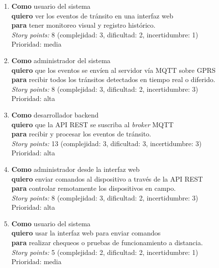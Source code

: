 \documentclass[
11pt, %
]{charter}
\begin{document}
\begin{enumerate}

\item
\textbf{Como} usuario del sistema\\
\textbf{quiero} ver los eventos de tránsito en una interfaz web\\
\textbf{para} tener monitoreo visual y registro histórico.\\
\textit{Story points:} 8 (complejidad: 3, dificultad: 2, incertidumbre: 1)\\
Prioridad: media

\item 
\textbf{Como} administrador del sistema\\
\textbf{quiero} que los eventos se envíen al servidor vía MQTT sobre GPRS\\
\textbf{para} recibir todos los tránsitos detectados en tiempo real o diferido.\\
\textit{Story points:} 8 (complejidad: 3, dificultad: 2, incertidumbre: 3)\\
Prioridad: alta

\item
\textbf{Como} desarrollador backend\\
\textbf{quiero} que la API REST se suscriba al \textit{broker} MQTT\\
\textbf{para} recibir y procesar los eventos de tránsito.\\
\textit{Story points:} 13 (complejidad: 3, dificultad: 3, incertidumbre: 3)\\
Prioridad: alta

\item 
\textbf{Como} administrador desde la interfaz web\\
\textbf{quiero} enviar comandos al dispositivo a través de la API REST\\
\textbf{para} controlar remotamente los dispositivos en campo.\\
\textit{Story points:} 8 (complejidad: 3, dificultad: 2, incertidumbre: 3)\\
Prioridad: alta

\item 
\textbf{Como} usuario del sistema\\
\textbf{quiero} usar la interfaz web para enviar comandos\\
\textbf{para} realizar chequeos o pruebas de funcionamiento a distancia.\\
\textit{Story points:} 5 (complejidad: 2, dificultad: 2, incertidumbre: 1)\\
Prioridad: media


\end{enumerate}
\end{document}
